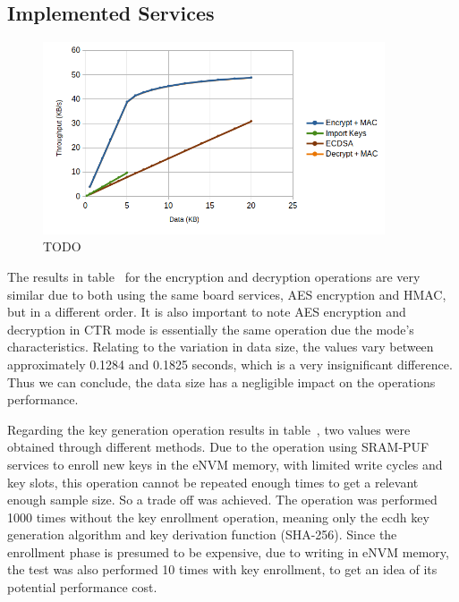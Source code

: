 \subsection{Implemented Services}\label{chap:evaluation:services}



\begin{figure}[h!]
	\centering
	\includegraphics[width=0.9\textwidth]{./Images/services-tput.png}
	\caption{TODO}
	\label{fig:performance:services-tput}
\end{figure}

The results in table~ for the encryption and decryption operations are very similar due to both using the same board services, AES encryption and HMAC, but in a different order. It is also important to note AES encryption and decryption in CTR mode is essentially the same operation due the mode's characteristics.
Relating to the variation in data size, the values vary between approximately 0.1284 and 0.1825 seconds, which is a very insignificant difference. Thus we can conclude, the data size has a negligible impact on the operations performance.

Regarding the key generation operation results in table~, two values were obtained through different methods. Due to the operation using SRAM-PUF services to enroll new keys in the eNVM memory, with limited write cycles and key slots, this operation cannot be repeated enough times to get a relevant enough sample size.
So a trade off was achieved. The operation was performed 1000 times without the key enrollment operation, meaning only the ecdh key generation algorithm and key derivation function (SHA-256).
Since the enrollment phase is presumed to be expensive, due to writing in eNVM memory, the test was also performed 10 times with key enrollment, to get an idea of its potential performance cost.


